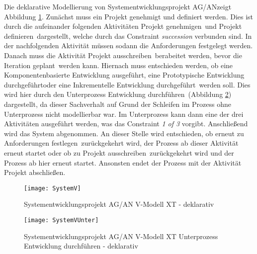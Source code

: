 {Die deklarative Modellierung von \grqq Systementwicklungsprojekt AG/AN\grqq  zeigt Abbildung \ref{fig:SystemV}. \newline
Zunächst muss ein Projekt genehmigt und definiert werden. Dies ist durch die aufeinander folgenden Aktivitäten \grqq Projekt genehmigen\grqq \ und \grqq Projekt definieren\grqq \ dargestellt, welche durch das Constraint \textit{succession} verbunden sind.\newline
In der nachfolgenden Aktivität müssen sodann die \grqq Anforderungen festgelegt werden\grqq. Danach muss die Aktivität \grqq Projekt ausschreiben\grqq \  berabeitet werden, bevor die \grqq Iteration geplant\grqq \ werden kann. \newline
Hiernach muss entschieden werden, ob eine \grqq Komponentenbasierte Entwicklung ausgeführt\grqq, eine \grqq Prototypische Entwicklung durchgeführt\grqq oder eine \grqq Inkrementelle Entwicklung durchgeführt\grqq \ werden soll. Dies wird hier durch den Unterprozess \grqq Entwicklung durchführen\grqq \ (Abbildung \ref{fig:SystemVUnter}) dargestellt, da dieser Sachverhalt auf Grund der Schleifen im Prozess ohne Unterprozess nicht modellierbar war. Im Unterprozess kann dann eine der drei Aktivitäten ausgeführt werden, was das Constraint \textit{1 of 3} vorgibt.\newline
Anschließend wird das \grqq System abgenommen\grqq.
An dieser Stelle wird entschieden, ob erneut zu \grqq Anforderungen festlegen\grqq \ zurückgekehrt wird, der Prozess ab dieser Aktivität erneut startet oder ob zu \grqq Projekt ausschreiben\grqq \ zurückgekehrt wird und der Prozess ab hier erneut startet. Ansonsten endet der Prozess mit der Aktivität \grqq Projekt abschließen\grqq.

\begin{figure}[!htbp]
\begin{center}
  \texttt{[image: SystemV]} %
  \caption{Systementwicklungsprojekt AG/AN  V-Modell XT - deklarativ}
  \label{fig:SystemV}
\end{center}
\end{figure}

\begin{figure}[!htbp]
\begin{center}
  \texttt{[image: SystemVUnter]} %
  \caption{Systementwicklungsprojekt AG/AN  V-Modell XT Unterprozess Entwicklung durchführen - deklarativ}
  \label{fig:SystemVUnter}
\end{center}
\end{figure}



}
